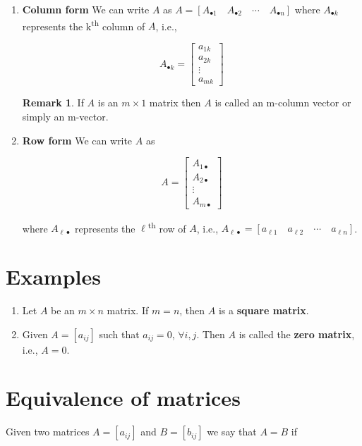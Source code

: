 \documentclass[12pt]{article}
\theoremstyle{definition}
\newtheorem*{remark}{Remark}
\begin{document}
\begin{enumerate}
\item \textbf{Column form} We can write $A$ as 
$A = [A_{\bullet 1} \quad A_{\bullet 2} \quad \cdots \quad A_{\bullet n}]$
where $A_{\bullet k}$ represents the k\textsuperscript{th} column of $A$, i.e.,

\[
A_{\bullet k} =
\begin{bmatrix}
a_{1 k} \\
a_{2 k} \\
\vdots \\
a_{m k}
\end{bmatrix}
\]

\begin{remark}
If $A$ is an $m \times 1$ matrix then $A$ is called an m-column vector or simply
an m-vector.
\end{remark}

\item \textbf{Row form} We can write $A$ as

\[
A =
\begin{bmatrix}
A_{1 \bullet} \\
A_{2 \bullet} \\
\vdots \\
A_{m \bullet}
\end{bmatrix}
\]

where $A_{\ell \bullet}$ represents the $\ell$\textsuperscript{th} row of $A$, i.e.,
$A_{\ell \bullet} = [a_{\ell 1} \quad a_{\ell 2} \quad \cdots \quad a_{\ell n}]$.
\end{enumerate}


\section{Examples}

\begin{enumerate}
\item Let $A$ be an $m \times n$ matrix. If $m = n$, then $A$ is a \textbf{square matrix}.

\item Given $A = [a_{ij}]$ such that $a_{ij} = 0$, $\forall i, j$. Then $A$ is called
the \textbf{zero matrix}, i.e., $A = 0$.
\end{enumerate}

\section{Equivalence of matrices}

Given two matrices $A = [a_{ij}]$ and $B = [b_{ij}]$ we say that $A = B$ if
\end{document}
